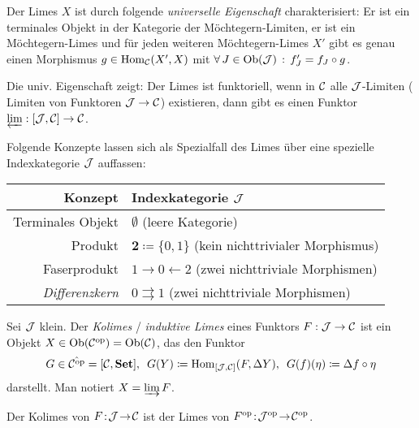 \documentclass{cheat-sheet}
\begin{document}
\begin{bem}
  Der Limes $X$ ist durch folgende \emph{universelle Eigenschaft} charakterisiert:
  Er ist ein terminales Objekt in der Kategorie der Möchtegern-Limiten, \dh{} er ist ein Möchtegern-Limes und für jeden weiteren Möchtegern-Limes $X'$ gibt es genau einen Morphismus $g \in \operatorname{Hom}_{\mathcal{C}}(X', X)$ mit
  $\forall \, {J \in \operatorname{Ob}(\mathcal{J})} \,:\, f'_J = f_J \circ g$.
\end{bem}

\begin{bem}
  Die univ. Eigenschaft zeigt: Der Limes ist funktoriell, \dh{} wenn in $\mathcal{C}$ alle $\mathcal{J}$-Limiten (\dh{} Limiten von Funktoren $\mathcal{J} \to \mathcal{C}$) existieren, dann gibt es einen Funktor $\varprojlim : [\mathcal{J}, \mathcal{C}] \to \mathcal{C}$.
\end{bem}

\begin{bem}
  Folgende Konzepte lassen sich als Spezialfall des Limes über eine spezielle Indexkategorie $\mathcal{J}$ auffassen:
  \begin{center}
    \begin{tabular}{ | r | l | }
      \hline
      Konzept & Indexkategorie $\mathcal{J}$ \\ \hline
      Terminales Objekt & $\emptyset$ (leere Kategorie) \\
      Produkt & $\mathbf{2} \coloneqq \{ 0, 1 \}$ (kein nichttrivialer Morphismus) \\
      Faserprodukt & $1 \to 0 \leftarrow 2$ (zwei nichttriviale Morphismen) \\
      \emph{Differenzkern} &  $0 \rightrightarrows 1$ (zwei nichttriviale Morphismen) \\ \hline
    \end{tabular}
  \end{center}
\end{bem}


\begin{defn}
  Sei $\mathcal{J}$ klein.
  Der \emph{Kolimes} / \emph{induktive Limes} eines Funktors $F : \mathcal{J} \to \mathcal{C}$ ist ein Objekt $X \in \operatorname{Ob}(\mathcal{C}^{\mathrm{op}}) = \operatorname{Ob}(\mathcal{C})$, das den Funktor
  \[
    G \in \hat{\mathcal{C}^{\mathrm{op}}} = [\mathcal{C}, \mathbf{Set}], \enspace
    G(Y) \coloneqq \operatorname{Hom}_{[\mathcal{J}, \mathcal{C}]}(F, \Delta Y), \enspace
    G(f)(\eta) \coloneqq \Delta f \circ \eta
  \]
  darstellt. Man notiert $X = \varinjlim F$.
\end{defn}

\begin{bem}
  Der Kolimes von $F \!:\! \mathcal{J} \!\to\! \mathcal{C}$ ist der Limes von $F^{\mathrm{op}} \!:\! \mathcal{J}^{\mathrm{op}} \!\to\! \mathcal{C}^{\mathrm{op}}$.
\end{bem}
\end{document}
